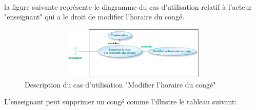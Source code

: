 \documentclass[12 pt]{report}
\begin{document}
\\
la figure suivante représente le diagramme du cas d'utilisation relatif à l'acteur "enseignant" qui a le droit de modifier l'horaire  du congé.
\begin{figure}[h]
\begin{center}
\includegraphics[width= 14cm , height =2.5cm]{e41.png}
\caption{Description du cas d'utilisation "Modifier l'horaire du congé"}
\end{center}
\end{figure}
\newpage
L'enseignant peut supprimer un congé comme l'illustre le tableau suivant:
\end{document}
